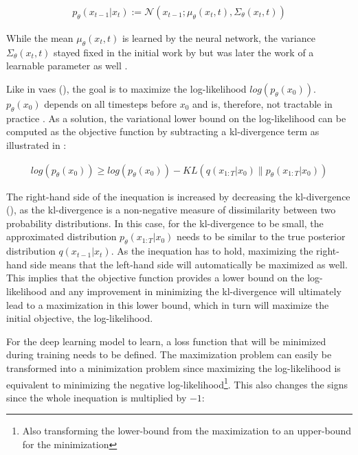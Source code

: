 \begin{equation}
  \label{eqn:reverse_2}
  \begin{align*}
    p_{\theta}(x_{t-1}|x_t) := \mathcal{N}(x_{t-1}; \mu_{\theta}(x_t, t), \Sigma_{\theta}(x_t, t))
  \end{align*}
\end{equation}
    
While the mean $\mu_{\theta}(x_t, t)$ is learned by the neural network, the variance $\Sigma_{\theta}(x_t, t)$ stayed fixed in the initial work by \cite{ho2020DenoisingDiffusionProbabilistic} 
but was later the work of \textcite{nichol2021ImprovedDenoisingDiffusion} a learnable parameter as well \cite{zbinden2022ImplementingExperimentingDiffusion}.

Like in \glspl{vae} (), the goal is to maximize the log-likelihood $log(p_\theta(x_0))$.
$p_\theta(x_0)$ depends on all timesteps before $x_0$ and is, therefore, not tractable in practice \cite{zbinden2022ImplementingExperimentingDiffusion}.
As a solution, the variational lower bound on the log-likelihood can be computed as the objective function by subtracting a \gls{kl}-divergence term as illustrated in : %

\begin{equation}
  \label{eqn:vlb}
  \begin{align*}
    log(p_\theta(x_0)) \geq log(p_\theta(x_0)) - KL(q(x_{1:T}|x_0) \parallel p_\theta(x_{1:T}|x_0))
  \end{align*}
\end{equation}

The right-hand side of the inequation is increased by decreasing the \gls{kl}-divergence (), as the \gls{kl}-divergence is a non-negative measure of dissimilarity between two probability distributions. 
In this case, for the \gls{kl}-divergence to be small, the approximated distribution $p_\theta(x_{1:T}|x_0)$ needs to be similar to the true posterior distribution $q(x_{t-1}|x_t)$.
As the inequation has to hold, maximizing the right-hand side means that the left-hand side will automatically be maximized as well.
This implies that the objective function provides a lower bound on the log-likelihood and any improvement in minimizing the \gls{kl}-divergence will ultimately lead to a maximization in this lower bound, which in turn will maximize the initial objective, the log-likelihood.

For the deep learning \gls{model} to learn, a loss function that will be minimized during training needs to be defined.
The maximization problem can easily be transformed into a minimization problem since maximizing the log-likelihood is equivalent to minimizing the negative log-likelihood\footnote{Also transforming the lower-bound from the maximization to an upper-bound for the minimization}.
This also changes the signs since the whole inequation is multiplied by $-1$:

